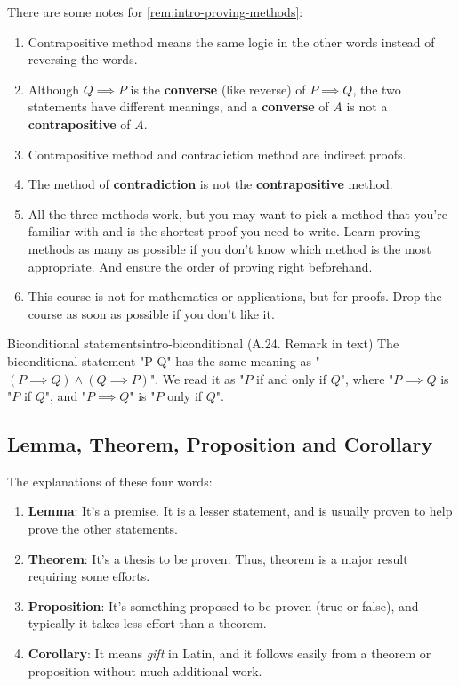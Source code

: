 \documentclass[../src/handouts/main.tex]{subfiles}
\begin{document}
There are some notes for \cref{rem:intro-proving-methods}:
\begin{enumerate}
  \item Contrapositive method means the same logic in the other words instead of reversing the words.
  \item Although $Q \implies P$ is the \textbf{converse} (like reverse) of $P \implies Q$, the two statements have different meanings, and a \textbf{converse} of $A$ is not a \textbf{contrapositive} of $A$.
  \item Contrapositive method and contradiction method are indirect proofs.
  \item The method of \textbf{contradiction} is not the \textbf{contrapositive} method.
  \item All the three methods work, but you may want to pick a method that you're familiar with and is the shortest proof you need to write. Learn proving methods as many as possible if you don't know which method is the most appropriate. And ensure the order of proving right beforehand.
  \item This course is not for mathematics or applications, but for proofs. Drop the course as soon as possible if you don't like it.
\end{enumerate}

\begin{remark}{Biconditional statements}{intro-biconditional}
  (A.24. Remark in text)
  The biconditional statement "P \iff Q" has the same meaning as "$(P \implies Q) \land (Q \implies P)$". We read it as "$P$ if and only if $Q$", where "$P \implies Q$ is "$P$ if $Q$", and "$P \implies Q$" is "$P$ only if $Q$".
\end{remark}

\subsection{Lemma, Theorem, Proposition and Corollary}

The explanations of these four words:
\begin{enumerate}
  \item \textbf{Lemma}: It's a premise. It is a lesser statement, and is usually proven to help prove the other statements.
  \item \textbf{Theorem}: It's a thesis to be proven. Thus, theorem is a major result requiring some efforts.
  \item \textbf{Proposition}: It's something proposed to be proven (true or false), and typically it takes less effort than a theorem.
  \item \textbf{Corollary}: It means \textit{gift} in Latin, and it follows easily from a theorem or proposition without much additional work.
\end{enumerate}
\end{document}
